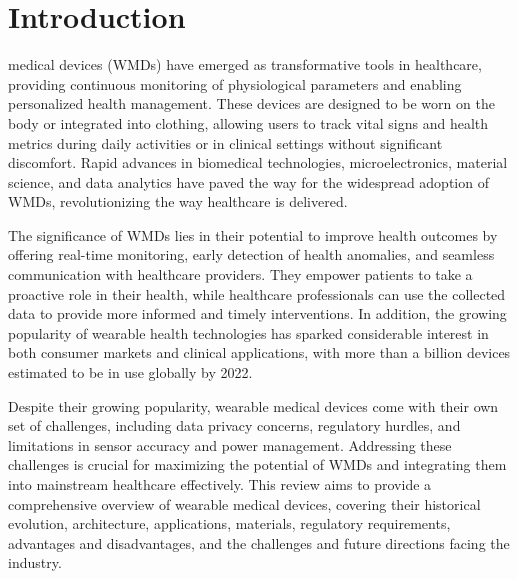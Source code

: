 \documentclass[journal]{IEEEtran}
\begin{document}
\section{Introduction}
% 
% 
% 
% 
 medical devices (WMDs) have emerged as transformative tools in healthcare, providing continuous monitoring of physiological parameters and enabling personalized health management. These devices are designed to be worn on the body or integrated into clothing, allowing users to track vital signs and health metrics during daily activities or in clinical settings without significant discomfort. Rapid advances in biomedical technologies, microelectronics, material science, and data analytics have paved the way for the widespread adoption of WMDs, revolutionizing the way healthcare is delivered.

The significance of WMDs lies in their potential to improve health outcomes by offering real-time monitoring, early detection of health anomalies, and seamless communication with healthcare providers. They empower patients to take a proactive role in their health, while healthcare professionals can use the collected data to provide more informed and timely interventions. In addition, the growing popularity of wearable health technologies has sparked considerable interest in both consumer markets and clinical applications, with more than a billion devices estimated to be in use globally by 2022.

Despite their growing popularity, wearable medical devices come with their own set of challenges, including data privacy concerns, regulatory hurdles, and limitations in sensor accuracy and power management. Addressing these challenges is crucial for maximizing the potential of WMDs and integrating them into mainstream healthcare effectively. This review aims to provide a comprehensive overview of wearable medical devices, covering their historical evolution, architecture, applications, materials, regulatory requirements, advantages and disadvantages, and the challenges and future directions facing the industry.
\end{document}
